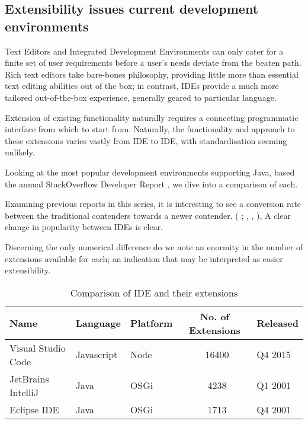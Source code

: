 \subsection{Extensibility issues current development environments}

Text Editors and Integrated Development Environments can only cater for a finite set of user requirements before a user's needs deviate from the beaten path. Rich text editors take bare-bones philosophy, providing little more than essential text editing abilities out of the box; in contrast, IDEs provide a much more tailored out-of-the-box experience, generally geared to particular language. 

Extension of existing functionality naturally requires a connecting programmatic interface from which to start from. Naturally, the functionality and approach to these extensions varies vastly from IDE to IDE, with standardisation seeming unlikely. 

Looking at the most popular development environments supporting Java, based the annual StackOverflow Developer Report \parencite{stackOverflowDevReport2019}, we dive into a comparison of each.

Examining previous reports in this series, it is interesting to see a conversion rate between the traditional contenders towards a newer contender. (\citeauthor{stackOverflowDevReport2018} ; , , ), A clear change in popularity between IDEs is clear. 

Discerning the only numerical difference do we note an enormity in the number of extensions available for each; an indication that may be interpreted as easier extensibility.

\begin{table}[h!]
\centering
\begin{tabular}{|l|l|l|c|l|}
	\hline 
	\rule[-1ex]{0pt}{2.5ex} Name & Language & Platform & No. of Extensions & Released \\ 
	\hline 
	\hline 
	\rule[-1ex]{0pt}{2.5ex} Visual Studio Code & Javascript & Node & ~16400 & Q4 2015\\ 
	\hline 
	\rule[-1ex]{0pt}{2.5ex} JetBrains IntelliJ & Java & OSGi  & ~4238 & Q1 2001 \\ 
	\hline 
	\rule[-1ex]{0pt}{2.5ex} Eclipse IDE & Java & OSGi & ~1713 & Q4 2001 \\ 
	\hline 
\end{tabular} 
\caption{Comparison of IDE and their extensions}
\end{table}

